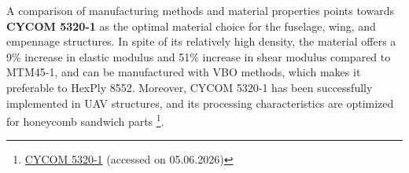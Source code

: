 A comparison of manufacturing methods and material properties points towards \textbf{CYCOM 5320-1} as the optimal material choice for the fuselage, wing, and empennage structures. In spite of its relatively high density, the material offers a 9\% increase in elastic modulus and 51\% increase in shear modulus compared to MTM45-1, and can be manufactured with VBO methods, which makes it preferable to HexPly 8552. Moreover, CYCOM 5320-1 has been successfully implemented in UAV structures, and its processing characteristics are optimized for honeycomb sandwich parts 
\footnote{\label{fn:cycom}\href{https://cstjmateriauxcomposites.wordpress.com/wp-content/uploads/2017/11/cycom5320_8hs.pdf}{CYCOM 5320-1} (accessed on 05.06.2026)}.%





